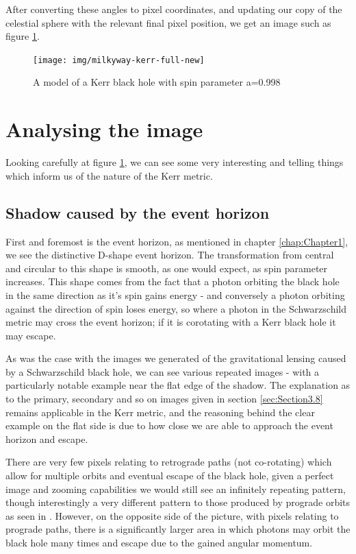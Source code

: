 \documentclass[oneside,openright,frontopenright, singlespacing]{dmathesis}
\begin{document}
\vspace{1em}
	After converting these angles to pixel coordinates, and updating our copy of the celestial sphere with the relevant final pixel position, we get an image such as figure \ref{fig:Figure4.3}.

\begin{figure}[!ht]
	\centering
	\texttt{[image: img/milkyway-kerr-full-new]}
	\caption{A model of a Kerr black hole with spin parameter a=0.998}
	\label{fig:Figure4.3}
\end{figure}

\section{Analysing the image}\label{sec:Section4.8}

	Looking carefully at figure \ref{fig:Figure4.3}, we can see some very interesting and telling things which inform us of the nature of the Kerr metric. 

\subsection{Shadow caused by the event horizon}\label{subsec:SubSection4.8.1}

\vspace{1em}
	First and foremost is the event horizon, as mentioned in chapter \ref{chap:Chapter1}, we see the distinctive D-shape event horizon. The transformation from central and circular to this shape is smooth, as one would expect, as spin parameter increases. This shape comes from the fact that a photon orbiting the black hole in the same direction as it's spin gains energy - and conversely a photon orbiting against the direction of spin loses energy, so where a photon in the Schwarzschild metric may cross the event horizon; if it is corotating with a Kerr black hole it may escape.

\vspace{1em}
	As was the case with the images we generated of the gravitational lensing caused by a Schwarzschild black hole, we can see various repeated images - with a particularly notable example near the flat edge of the shadow. The explanation as to the primary, secondary and so on images given in section \ref{sec:Section3.8} remains applicable in the Kerr metric, and the reasoning behind the clear example on the flat side is due to how close we are able to approach the event horizon and escape. 

\vspace{1em}
	There are very few pixels relating to retrograde paths (not co-rotating) which allow for multiple orbits and eventual escape of the black hole, given a perfect image and zooming capabilities we would still see an infinitely repeating pattern, though interestingly a very different pattern to those produced by prograde orbits as seen in \cite[pg. 8-11]{seeingRelativity}. However, on the opposite side of the picture, with pixels relating to prograde paths, there is a significantly larger area in which photons may orbit the black hole many times and escape due to the gained angular momentum.
\end{document}
